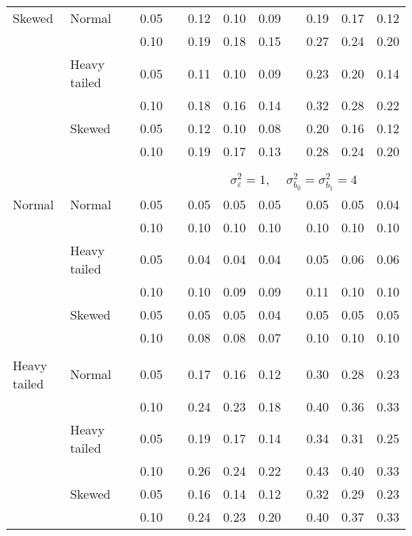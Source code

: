 \begin{table}[ht]
\begin{scriptsize}
\begin{tabular}{ll p{.1cm} c p{.1cm} rrr p{.1cm} rrr}
Skewed       & Normal       && 0.05 &&  0.12 & 0.10 & 0.09 && 0.19 & 0.17 & 0.12 \\ 
             &              && 0.10 &&  0.19 & 0.18 & 0.15 && 0.27 & 0.24 & 0.20 \\ 
             & Heavy tailed && 0.05 &&  0.11 & 0.10 & 0.09 && 0.23 & 0.20 & 0.14 \\ 
             &              && 0.10 &&  0.18 & 0.16 & 0.14 && 0.32 & 0.28 & 0.22 \\ 
             & Skewed       && 0.05 &&  0.12 & 0.10 & 0.08 && 0.20 & 0.16 & 0.12 \\ 
             &              && 0.10 &&  0.19 & 0.17 & 0.13 && 0.28 & 0.24 & 0.20 \\ 


&&&&&&&&&&&\\
& && && \multicolumn{7}{c}{$\sigma_{\varepsilon}^2 = 1$, \ \ $\sigma_{b_0}^2 = \sigma_{b_1}^2 = 4$} \\ \cline{6-12}
\rowcolor{gray!20}Normal       & Normal       && 0.05 &&  0.05 & 0.05 & 0.05 && 0.05 & 0.05 & 0.04 \\ 
\rowcolor{gray!20}             &              && 0.10 &&  0.10 & 0.10 & 0.10 && 0.10 & 0.10 & 0.10 \\ 
\rowcolor{gray!20}             & Heavy tailed && 0.05 &&  0.04 & 0.04 & 0.04 && 0.05 & 0.06 & 0.06 \\ 
\rowcolor{gray!20}             &              && 0.10 &&  0.10 & 0.09 & 0.09 && 0.11 & 0.10 & 0.10 \\ 
\rowcolor{gray!20}             & Skewed       && 0.05 &&  0.05 & 0.05 & 0.04 && 0.05 & 0.05 & 0.05 \\ 
\rowcolor{gray!20}             &              && 0.10 &&  0.08 & 0.08 & 0.07 && 0.10 & 0.10 & 0.10 \\ 
             &&&&&&&&&&&\\
Heavy tailed & Normal       && 0.05 &&  0.17 & 0.16 & 0.12 && 0.30 & 0.28 & 0.23 \\ 
             &              && 0.10 &&  0.24 & 0.23 & 0.18 && 0.40 & 0.36 & 0.33 \\ 
             & Heavy tailed && 0.05 &&  0.19 & 0.17 & 0.14 && 0.34 & 0.31 & 0.25 \\ 
             &              && 0.10 &&  0.26 & 0.24 & 0.22 && 0.43 & 0.40 & 0.33 \\ 
             & Skewed       && 0.05 &&  0.16 & 0.14 & 0.12 && 0.32 & 0.29 & 0.23 \\ 
             &              && 0.10 &&  0.24 & 0.23 & 0.20 && 0.40 & 0.37 & 0.33 \\ 

\end{tabular}
\end{scriptsize}
\end{table}
